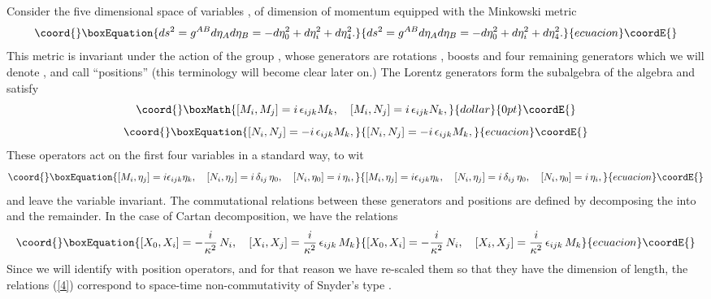 \documentclass  [12pt] {article}
\begin{document}
Consider the five dimensional space of variables \coordHE{}, \coordHE{} of
dimension of momentum equipped with the Minkowski metric
\begin{equation}\coord{}\boxEquation{\label{1}
ds^2 = g^{AB}d\eta_A d\eta_B = -d\eta_0^2 + d\eta_i^2 + d\eta_4^2.
}{ds^2 = g^{AB}d\eta_A d\eta_B = -d\eta_0^2 + d\eta_i^2 + d\eta_4^2.
}{ecuacion}\coordE{}\end{equation}
This metric is invariant under the action of the group \coordHE{}, whose
generators are rotations \coordHE{}, boosts \coordHE{} and four remaining generators
which we will denote \coordHE{}, and call ``positions'' (this terminology will
become clear later on.) The Lorentz generators form the \coordHE{}
subalgebra of the \coordHE{}   algebra and satisfy
$$\coord{}\boxMath{
[M_i, M_j] = i\, \epsilon_{ijk} M_k, \quad [M_i, N_j] = i\, \epsilon_{ijk} N_k,
}{dollar}{0pt}\coordE{}$$
\begin{equation}\coord{}\boxEquation{\label{2}
  [N_i, N_j] = -i\, \epsilon_{ijk} M_k,
}{[N_i, N_j] = -i\, \epsilon_{ijk} M_k,
}{ecuacion}\coordE{}\end{equation}
These operators act on the first four variables \myHighlight{$\eta_\mu$}\coordHE{} in a standard way,
to wit
\begin{equation}\coord{}\boxEquation{\label{3}
  [M_i, \eta_j] = i\epsilon_{ijk}\eta_k, \quad [N_i, \eta_j] = i\, \delta_{ij}\, \eta_0, \quad [N_i, \eta_0] = i\,  \eta_i,
}{[M_i, \eta_j] = i\epsilon_{ijk}\eta_k, \quad [N_i, \eta_j] = i\, \delta_{ij}\, \eta_0, \quad [N_i, \eta_0] = i\,  \eta_i,
}{ecuacion}\coordE{}\end{equation}
and leave the variable \coordHE{} invariant. The commutational relations between
these generators and positions are defined by  decomposing the \coordHE{}
into \coordHE{} and the remainder. In the case of Cartan decomposition,
we have the relations
\begin{equation}\coord{}\boxEquation{\label{4}
 [X_0, X_i] = -\frac{i}{\kappa^2}\, N_i, \quad [X_i, X_j] = \frac{i}{\kappa^2}\,\epsilon_{ijk}\, M_k
}{[X_0, X_i] = -\frac{i}{\kappa^2}\, N_i, \quad [X_i, X_j] = \frac{i}{\kappa^2}\,\epsilon_{ijk}\, M_k
}{ecuacion}\coordE{}\end{equation}
Since we will identify \coordHE{} with position operators, and for that reason we
have re-scaled them so that they have the dimension of length, the relations
(\ref{4}) correspond to space-time non-commutativity of Snyder's type
\cite{snyder}.
\end{document}
